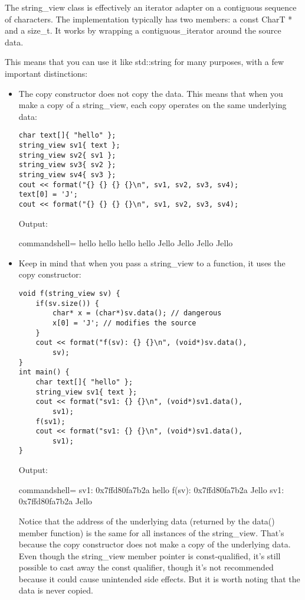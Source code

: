 The string\_view class is effectively an iterator adapter on a contiguous sequence of characters. The implementation typically has two members: a const CharT * and a size\_t. It works by wrapping a contiguous\_iterator around the source data.

This means that you can use it like std::string for many purposes, with a few important distinctions:

\begin{itemize}
\item 
The copy constructor does not copy the data. This means that when you make a copy of a string\_view, each copy operates on the same underlying data:

\begin{lstlisting}[style=styleCXX]
char text[]{ "hello" };
string_view sv1{ text };
string_view sv2{ sv1 };
string_view sv3{ sv2 };
string_view sv4{ sv3 };
cout << format("{} {} {} {}\n", sv1, sv2, sv3, sv4);
text[0] = 'J';
cout << format("{} {} {} {}\n", sv1, sv2, sv3, sv4);
\end{lstlisting}

Output:

\begin{tcblisting}{commandshell={}}
hello hello hello hello
Jello Jello Jello Jello
\end{tcblisting}

\item 
Keep in mind that when you pass a string\_view to a function, it uses the copy constructor:

\begin{lstlisting}[style=styleCXX]
void f(string_view sv) {
	if(sv.size()) {
		char* x = (char*)sv.data(); // dangerous
		x[0] = 'J'; // modifies the source
	}
	cout << format("f(sv): {} {}\n", (void*)sv.data(),
		sv);
}
int main() {
	char text[]{ "hello" };
	string_view sv1{ text };
	cout << format("sv1: {} {}\n", (void*)sv1.data(),
		sv1);
	f(sv1);
	cout << format("sv1: {} {}\n", (void*)sv1.data(),
		sv1);
}
\end{lstlisting}

Output:

\begin{tcblisting}{commandshell={}}
sv1: 0x7ffd80fa7b2a hello
f(sv): 0x7ffd80fa7b2a Jello
sv1: 0x7ffd80fa7b2a Jello
\end{tcblisting}

Notice that the address of the underlying data (returned by the data() member function) is the same for all instances of the string\_view. That's because the copy constructor does not make a copy of the underlying data. Even though the string\_view member pointer is const-qualified, it's still possible to cast away the const qualifier, though it's not recommended because it could cause unintended side effects. But it is worth noting that the data is never copied.


\end{itemize}
